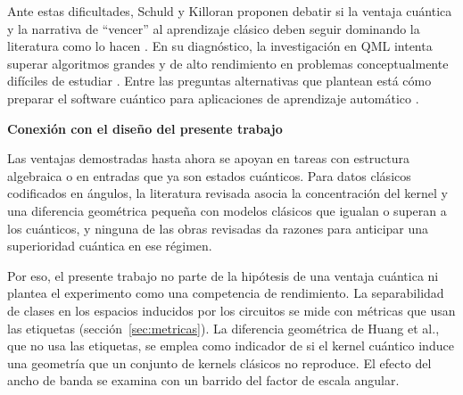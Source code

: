 Ante estas dificultades, Schuld y Killoran proponen debatir si la ventaja cuántica y la narrativa de ``vencer'' al aprendizaje clásico deben seguir dominando la literatura como lo hacen \cite{SchuldKilloran2022Advantage}.
En su diagnóstico, la investigación en QML intenta superar algoritmos grandes y de alto rendimiento en problemas conceptualmente difíciles de estudiar \cite{SchuldKilloran2022Advantage}.
Entre las preguntas alternativas que plantean está cómo preparar el software cuántico para aplicaciones de aprendizaje automático \cite{SchuldKilloran2022Advantage}.

\textbf{Conexión con el diseño del presente trabajo}

Las ventajas demostradas hasta ahora se apoyan en tareas con estructura algebraica o en entradas que ya son estados cuánticos. Para datos clásicos codificados en ángulos, la literatura revisada asocia la concentración del kernel y una diferencia geométrica pequeña con modelos clásicos que igualan o superan a los cuánticos, y ninguna de las obras revisadas da razones para anticipar una superioridad cuántica en ese régimen.

Por eso, el presente trabajo no parte de la hipótesis de una ventaja cuántica ni plantea el experimento como una competencia de rendimiento. La separabilidad de clases en los espacios inducidos por los circuitos se mide con métricas que usan las etiquetas (sección~\ref{sec:metricas}). La diferencia geométrica de Huang et al., que no usa las etiquetas, se emplea como indicador de si el kernel cuántico induce una geometría que un conjunto de kernels clásicos no reproduce. El efecto del ancho de banda se examina con un barrido del factor de escala angular.
